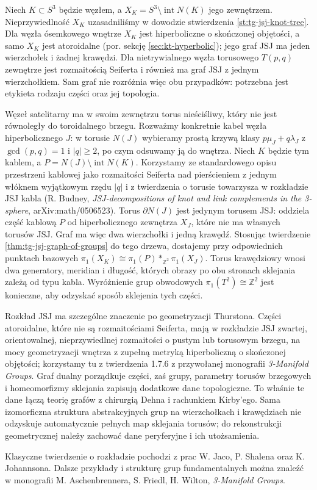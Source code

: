 \begin{przyklad}
Niech $K\subset S^3$ będzie węzłem, a
$X_K=S^3\setminus\operatorname{int}N(K)$ jego
zewnętrzem. Nieprzywiedlność $X_K$ uzasadniliśmy
w dowodzie stwierdzenia \ref{st:tg-jsj-knot-tree}.
Dla węzła ósemkowego wnętrze $X_K$ jest
hiperboliczne o skończonej objętości, a samo
$X_K$ jest atoroidalne (por. sekcję
\ref{sec:kt-hyperbolic});
jego graf JSJ ma jeden wierzchołek i żadnej krawędzi.
Dla nietrywialnego węzła torusowego $T(p,q)$
zewnętrze jest rozmaitością Seiferta i również
ma graf JSJ z jednym wierzchołkiem. Sam graf nie
rozróżnia więc obu przypadków: potrzebna jest
etykieta rodzaju części oraz jej topologia.

Węzeł satelitarny ma w swoim zewnętrzu torus nieściśliwy,
który nie jest równoległy do toroidalnego brzegu.
Rozważmy konkretnie kabel węzła hiperbolicznego
$J$: w torusie $N(J)$ wybieramy prostą krzywą
klasy $p\mu_J+q\lambda_J$ z $\gcd(p,q)=1$ i
$|q|\ge2$, po czym odsuwamy ją do wnętrza.
Niech $K$ będzie tym kablem, a
$P=N(J)\setminus\operatorname{int}N(K)$.
Korzystamy ze standardowego opisu przestrzeni
kablowej jako rozmaitości Seiferta nad pierścieniem
z jednym włóknem wyjątkowym rzędu $|q|$
i z twierdzenia o torusie towarzysza w rozkładzie
JSJ kabla (R. Budney, \emph{JSJ-decompositions of
knot and link complements in the 3-sphere},
arXiv:math/0506523).
Torus $\partial N(J)$ jest jedynym torusem JSJ:
oddziela część kablową $P$ od hiperbolicznego
zewnętrza $X_J$, które nie ma własnych torusów JSJ.
Graf ma więc dwa wierzchołki i jedną krawędź.
Stosując twierdzenie \ref{thm:tg-jsj-graph-of-groups}
do tego drzewa, dostajemy przy odpowiednich
punktach bazowych
$\pi_1(X_K)\cong\pi_1(P)*_{\mathbb Z^2}\pi_1(X_J)$.
Torus krawędziowy wnosi dwa generatory, meridian i długość,
których obrazy po obu stronach sklejania zależą od typu kabla. Wyróżnienie grup obwodowych
$\pi_1(T^2)\cong\mathbb Z^2$ jest konieczne,
aby odzyskać sposób sklejenia tych części.
\end{przyklad}

\begin{uwaga}
Rozkład JSJ ma szczególne znaczenie po
geometryzacji Thurstona. Części atoroidalne,
które nie są rozmaitościami Seiferta, mają
w rozkładzie JSJ zwartej, orientowalnej,
nieprzywiedlnej rozmaitości o pustym lub
torusowym brzegu, na mocy geometryzacji
wnętrza z zupełną metryką hiperboliczną
o skończonej objętości; korzystamy tu z
twierdzenia 1.7.6 z przywołanej monografii
\emph{3-Manifold Groups}.
Graf dualny porządkuje części, zaś grupy,
parametry torusów brzegowych i homeomorfizmy
sklejania zapisują dodatkowe dane topologiczne.
To właśnie te dane łączą teorię grafów z
chirurgią Dehna i rachunkiem Kirby'ego. Sama
izomorficzna struktura abstrakcyjnych grup na wierzchołkach
i krawędziach nie odzyskuje automatycznie pełnych map
sklejania torusów; do rekonstrukcji geometrycznej
należy zachować dane peryferyjne i ich utożsamienia.
\end{uwaga}

\begin{uwaga}[Literatura]
Klasyczne twierdzenie o rozkładzie pochodzi z prac
W. Jaco, P. Shalena oraz K. Johannsona.
Dalsze przykłady i strukturę grup fundamentalnych
można znaleźć w monografii M. Aschenbrennera,
S. Friedl, H. Wilton, \emph{3-Manifold Groups}.
\end{uwaga}



